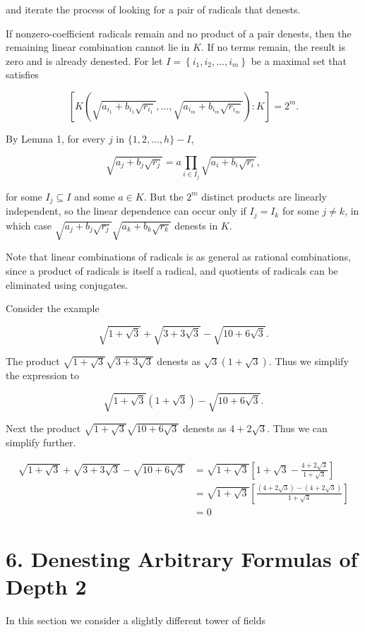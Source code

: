 \documentclass[11pt,letterpaper]{article}
\begin{document}
and iterate the process of looking for a pair of radicals that denests.

If nonzero-coefficient radicals remain and no product of a pair denests, then the remaining linear combination cannot lie in $K$. If no terms remain, the result is zero and is already denested. For let $I=\left\{i_{1}, i_{2}, \ldots, i_{m}\right\}$ be a maximal set that satisfies

\[
\left[K\left(\sqrt{a_{i_{1}}+b_{i_{1}} \sqrt{r_{i_{1}}}}, \ldots, \sqrt{a_{i_{m}}+b_{i_{m}} \sqrt{r_{i_{m}}}}\right): K\right]=2^{m} .
\]

By Lemma 1, for every $j$ in $\{1,2, \ldots, h\}-I$,

\[
\sqrt{a_{j}+b_{j} \sqrt{r_{j}}}=a \prod_{i \in I_{j}} \sqrt{a_{i}+b_{i} \sqrt{r_{i}}},
\]

for some $I_{j} \subseteq I$ and some $a \in K$. But the $2^{m}$ distinct products are linearly independent, so the linear dependence can occur only if $I_{j}=I_{k}$ for some $j \neq k$, in which case $\sqrt{a_{j}+b_{j} \sqrt{r_{j}}} \sqrt{a_{k}+b_{k} \sqrt{r_{k}}}$ denests in $K$.

Note that linear combinations of radicals is as general as rational combinations, since a product of radicals is itself a radical, and quotients of radicals can be eliminated using conjugates.

Consider the example

\[
\sqrt{1+\sqrt{3}}+\sqrt{3+3 \sqrt{3}}-\sqrt{10+6 \sqrt{3}} .
\]

The product $\sqrt{1+\sqrt{3}} \sqrt{3+3 \sqrt{3}}$ denests as $\sqrt{3}(1+\sqrt{3})$. Thus we simplify the expression to

\[
\sqrt{1+\sqrt{3}}(1+\sqrt{3})-\sqrt{10+6 \sqrt{3}} .
\]

Next the product $\sqrt{1+\sqrt{3}} \sqrt{10+6 \sqrt{3}}$ denests as $4+2 \sqrt{3}$. Thus we can simplify further.

\[
\begin{aligned}
\sqrt{1+\sqrt{3}}+\sqrt{3+3 \sqrt{3}}-\sqrt{10+6 \sqrt{3}} & =\sqrt{1+\sqrt{3}}\left[1+\sqrt{3}-\frac{4+2 \sqrt{3}}{1+\sqrt{3}}\right] \\
& =\sqrt{1+\sqrt{3}}\left[\frac{(4+2 \sqrt{3})-(4+2 \sqrt{3})}{1+\sqrt{3}}\right] \\
& =0
\end{aligned}
\]

\section*{6. Denesting Arbitrary Formulas of Depth 2}
In this section we consider a slightly different tower of fields
\end{document}
